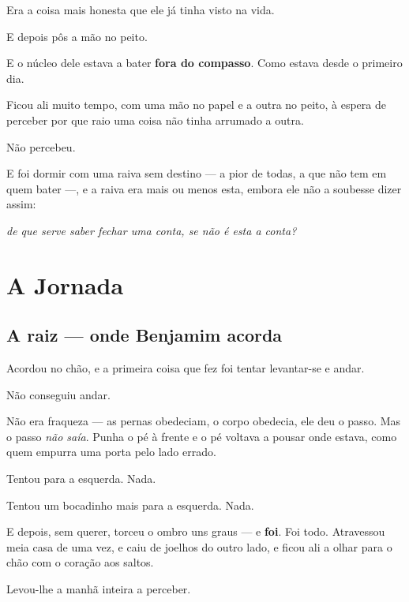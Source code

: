 \documentclass[livro.tex]{subfiles}
\begin{document}
Era a coisa mais honesta que ele já tinha visto na vida.

\medskip

E depois pôs a mão no peito.

E o núcleo dele estava a bater \textbf{fora do compasso}. Como estava desde o primeiro dia.

\medskip

Ficou ali muito tempo, com uma mão no papel e a outra no peito, à espera de perceber por que raio uma coisa não
tinha arrumado a outra.

Não percebeu.

E foi dormir com uma raiva sem destino --- a pior de todas, a que não tem em quem bater ---, e a raiva era mais ou
menos esta, embora ele não a soubesse dizer assim:

\emph{de que serve saber fechar uma conta, se não é esta a conta?}

\part{A Jornada}

\chapter{A raiz --- onde Benjamim acorda}

Acordou no chão, e a primeira coisa que fez foi tentar levantar-se e andar.

Não conseguiu andar.

\medskip

Não era fraqueza --- as pernas obedeciam, o corpo obedecia, ele deu o passo. Mas o passo \emph{não saía}. Punha o pé
à frente e o pé voltava a pousar onde estava, como quem empurra uma porta pelo lado errado.

Tentou para a esquerda. Nada.

Tentou um bocadinho mais para a esquerda. Nada.

E depois, sem querer, torceu o ombro uns graus --- e \textbf{foi}. Foi todo. Atravessou meia casa de uma vez, e caiu
de joelhos do outro lado, e ficou ali a olhar para o chão com o coração aos saltos.

\medskip

Levou-lhe a manhã inteira a perceber.
\end{document}

